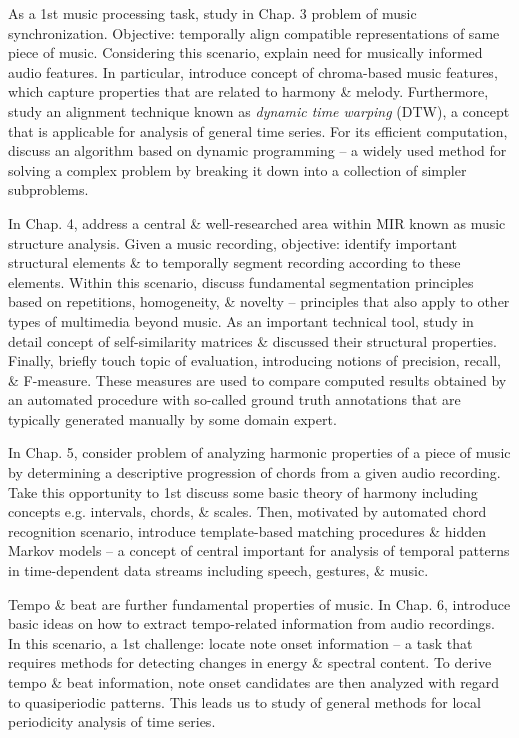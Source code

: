 \documentclass{article}
\begin{document}
\begin{itemize}
\begin{itemize}
		As a 1st music processing task, study in Chap. 3 problem of music synchronization. Objective: temporally align compatible representations of same piece of music. Considering this scenario, explain need for musically informed audio features. In particular, introduce concept of chroma-based music features, which capture properties that are related to harmony \& melody. Furthermore, study an alignment technique known as {\it dynamic time warping} (DTW), a concept that is applicable for analysis of general time series. For its efficient computation, discuss an algorithm based on dynamic programming -- a widely used method for solving a complex problem by breaking it down into a collection of simpler subproblems.
		
		In Chap. 4, address a central \& well-researched area within MIR known as music structure analysis. Given a music recording, objective: identify important structural elements \& to temporally segment recording according to these elements. Within this scenario, discuss fundamental segmentation principles based on repetitions, homogeneity, \& novelty -- principles that also apply to other types of multimedia beyond music. As an important technical tool, study in detail concept of self-similarity matrices \& discussed their structural properties. Finally, briefly touch topic of evaluation, introducing notions of precision, recall, \& F-measure. These measures are used to compare computed results obtained by an automated procedure with so-called ground truth annotations that are typically generated manually by some domain expert.
		
		In Chap. 5, consider problem of analyzing harmonic properties of a piece of music by determining a descriptive progression of chords from a given audio recording. Take this opportunity to 1st discuss some basic theory of harmony including concepts e.g. intervals, chords, \& scales. Then, motivated by automated chord recognition scenario, introduce template-based matching procedures \& hidden Markov models -- a concept of central important for analysis of temporal patterns in time-dependent data streams including speech, gestures, \& music.
		
		Tempo \& beat are further fundamental properties of music. In Chap. 6, introduce basic ideas on how to extract tempo-related information from audio recordings. In this scenario, a 1st challenge: locate note onset information -- a task that requires methods for detecting changes in energy \& spectral content. To derive tempo \& beat information, note onset candidates are then analyzed with regard to quasiperiodic patterns. This leads us to study of general methods for local periodicity analysis of time series.
		

\end{itemize}
\end{itemize}
\end{document}
